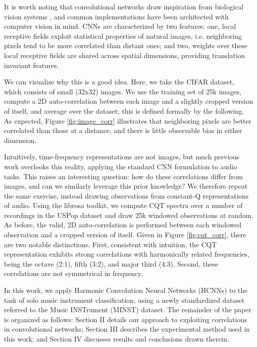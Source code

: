 \documentclass{article}
\begin{document}
It is worth noting that convolutional networks draw inspiration from biological vision systems \cite{Hubel1964, LeCun1998}, and common implementations have been architected with computer vision in mind.
CNNs are characterized by two features:
one, local receptive fields exploit statistical properties of natural images, i.e. neighboring pixels tend to be more correlated than distant ones;
and two, weights over these local receptive fields are shared across spatial dimensions, providing translation invariant features.

We can visualize why this is a good idea.
Here, we take the CIFAR dataset, which consists of small (32x32) images.
We use the training set of 25k images, compute a 2D auto-correlation between each image and a slightly cropped version of itself, and average over the dataset;
this is defined formally by the following.
As expected, Figure \ref{fig:image_corr} illustrates that neighboring pixels are better correlated than those at a distance, and there is little observable bias in either dimension.

Intuitively, time-frequency representations are not images, but much previous work overlooks this reality, applying the standard CNN formulation to audio tasks.
This raises an interesting question: how do these correlations differ from images, and can we similarly leverage this prior knowledge?
We therefore repeat the same exercise, instead drawing observations from constant-Q representations of audio.
Using the librosa toolkit, we compute CQT spectra over a number of recordings in the USPop dataset\cite{Ellis2002} and draw 25k windowed observations at random.
As before, the valid, 2D auto-correlation is performed between each windowed observation and a cropped version of itself.
Given in Figure \ref{fig:cqt_corr}, there are two notable distinctions.
First, consistent with intuition, the CQT representation exhibits strong correlations with harmonically related frequencies, being the octave (2:1), fifth (3:2), and major third (4:3).
Second, these correlations are not symmetrical in frequency.

In this work, we apply Harmonic Convolution Neural Networks (HCNNs) to the task of solo music instrument classification, using a newly standardized dataset referred to the Music INSTrument (MINST) dataset.
The remainder of the paper is organized as follows:
Section II details our approach to exploiting correlations in convolutional networks;
Section III describes the experimental method used in this work;
and Section IV discusses results and conclusions drawn therein.
\end{document}
